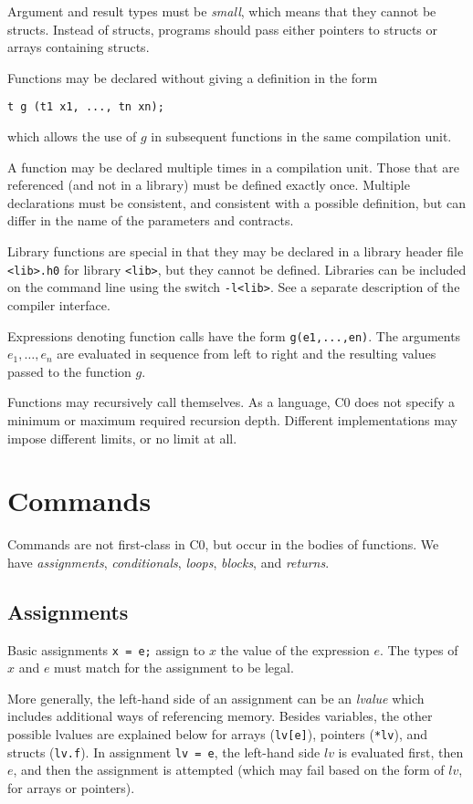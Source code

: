 \documentclass[11pt]{article}
\begin{document}
Argument and result types must be \emph{small}, which means that
they cannot be structs.  Instead of structs, programs should
pass either pointers to structs or arrays containing structs.

Functions may be declared without giving a definition in the form
\begin{lstlisting}
t g (t1 x1, ..., tn xn);
\end{lstlisting}
which allows the use of $g$ in subsequent functions in the same
compilation unit.

A function may be declared multiple times in a compilation unit.
Those that are referenced (and not in a library) must be defined
exactly once.  Multiple declarations must be consistent, and
consistent with a possible definition, but can differ in the name of
the parameters and contracts.

Library functions are special in that they may be declared in
a library header file \lstinline'<lib>.h0' for library \lstinline'<lib>', but
they cannot be defined.  Libraries can be included on the
command line using the switch \lstinline'-l<lib>'.  See a separate
description of the compiler interface.

Expressions denoting function calls have the form \lstinline'g(e1,...,en)'.
The arguments $e_1, \ldots, e_n$ are evaluated in sequence from
left to right and the resulting values passed to the function $g$.

Functions may recursively call themselves. As a language, C0 does not 
specify a minimum or maximum required recursion depth. Different implementations
may impose different limits, or no limit at all.

\section{Commands}

Commands are not first-class in C0, but occur in the bodies
of functions.  We have \emph{assignments}, \emph{conditionals},
\emph{loops}, \emph{blocks}, and \emph{returns}.

\subsection{Assignments}

Basic assignments \lstinline'x = e;' assign to $x$ the value
of the expression $e$.  The types of $x$ and $e$ must match
for the assignment to be legal.

More generally, the left-hand side of an assignment can be an
\emph{lvalue} which includes additional ways of referencing memory.
Besides variables, the other possible lvalues are explained below for
arrays (\lstinline'lv[e]'), pointers (\lstinline'*lv'), and structs
(\lstinline'lv.f').  In assignment \lstinline'lv = e', the left-hand side
$lv$ is evaluated first, then $e$, and then the assignment is
attempted (which may fail based on the form of $lv$, for arrays
or pointers).
\end{document}
